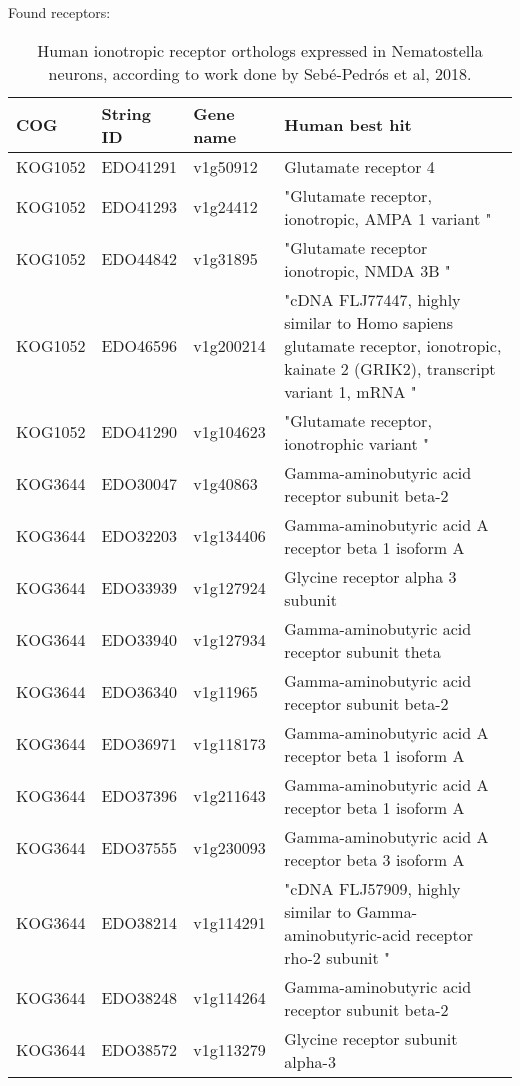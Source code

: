Found receptors:

\begin{longtable}[l]{lll>{\raggedright\arraybackslash}p{30em}}
\caption{\label{tab:unnamed-chunk-5}Human ionotropic receptor orthologs expressed in Nematostella neurons, according to work done by Sebé-Pedrós et al, 2018.}\\
\toprule
COG & String ID & Gene name & Human best hit\\
\midrule
\rowcolor{gray!6}  KOG1052 & EDO41291 & v1g50912 & Glutamate receptor 4\\
KOG1052 & EDO41293 & v1g24412 & "Glutamate receptor, ionotropic, AMPA 1 variant "\\
\rowcolor{gray!6}  KOG1052 & EDO44842 & v1g31895 & "Glutamate receptor ionotropic, NMDA 3B "\\
KOG1052 & EDO46596 & v1g200214 & "cDNA FLJ77447, highly similar to Homo sapiens glutamate receptor, ionotropic, kainate 2 (GRIK2), transcript variant 1, mRNA "\\
\rowcolor{gray!6}  KOG1052 & EDO41290 & v1g104623 & "Glutamate receptor, ionotrophic variant "\\
KOG3644 & EDO30047 & v1g40863 & Gamma-aminobutyric acid receptor subunit beta-2\\
\rowcolor{gray!6}  KOG3644 & EDO32203 & v1g134406 & Gamma-aminobutyric acid A receptor beta 1 isoform A\\
KOG3644 & EDO33939 & v1g127924 & Glycine receptor alpha 3 subunit\\
\rowcolor{gray!6}  KOG3644 & EDO33940 & v1g127934 & Gamma-aminobutyric acid receptor subunit theta\\
KOG3644 & EDO36340 & v1g11965 & Gamma-aminobutyric acid receptor subunit beta-2\\
\rowcolor{gray!6}  KOG3644 & EDO36971 & v1g118173 & Gamma-aminobutyric acid A receptor beta 1 isoform A\\
KOG3644 & EDO37396 & v1g211643 & Gamma-aminobutyric acid A receptor beta 1 isoform A\\
\rowcolor{gray!6}  KOG3644 & EDO37555 & v1g230093 & Gamma-aminobutyric acid A receptor beta 3 isoform A\\
KOG3644 & EDO38214 & v1g114291 & "cDNA FLJ57909, highly similar to Gamma-aminobutyric-acid receptor rho-2 subunit "\\
\rowcolor{gray!6}  KOG3644 & EDO38248 & v1g114264 & Gamma-aminobutyric acid receptor subunit beta-2\\
KOG3644 & EDO38572 & v1g113279 & Glycine receptor subunit alpha-3\\

\end{longtable}
